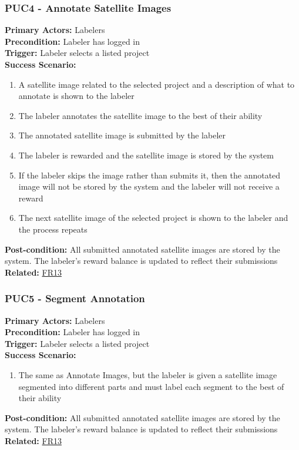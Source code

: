 \documentclass[12pt]{article}
\begin{document}
\subsubsection*{PUC4 - Annotate Satellite Images}
\label{sec:PUC4}
\textbf{Primary Actors:} Labelers\\ 
\textbf{Precondition:} Labeler has logged in\\
\textbf{Trigger:} Labeler selects a listed project\\
\textbf{Success Scenario:}
\begin{enumerate}
    \item A satellite image related to the selected project and a description of what to annotate is shown to the labeler
    \item The labeler annotates the satellite image to the best of their ability
    \item The annotated satellite image is submitted by the labeler
    \item The labeler is rewarded and the satellite image is stored by the system
    \item If the labeler skips the image rather than submits it, then the annotated image will not be stored by the system and the labeler will not receive a reward
    \item The next satellite image of the selected project is shown to the labeler and the process repeats
\end{enumerate}
\textbf{Post-condition:} All submitted annotated satellite images are stored by the system. The labeler's reward balance is updated to reflect their submissions\\
\textbf{Related:} \hyperref[sec:FR13]{FR13}

\subsubsection*{PUC5 - Segment Annotation}
\label{sec:PUC5}
\textbf{Primary Actors:} Labelers\\ 
\textbf{Precondition:} Labeler has logged in\\
\textbf{Trigger:} Labeler selects a listed project\\
\textbf{Success Scenario:}
\begin{enumerate}
    \item The same as Annotate Images, but the labeler is given a satellite image segmented into different parts and must label each segment to the best of their ability 
\end{enumerate}
\textbf{Post-condition:} All submitted annotated satellite images are stored by the system. The labeler's reward balance is updated to reflect their submissions\\
\textbf{Related:} \hyperref[sec:FR13]{FR13}
\end{document}
